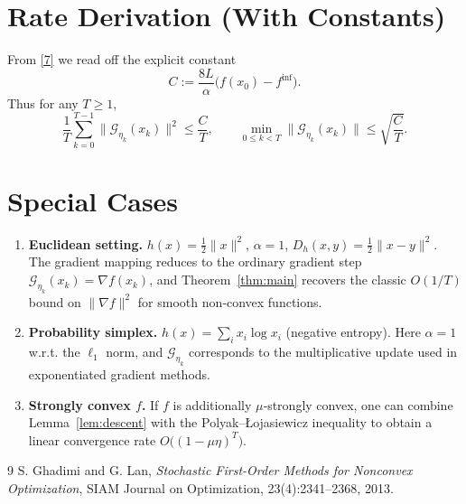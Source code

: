 \documentclass{article}
\newcommand{\Breg}{D_{h}}
\newcommand{\grad}{\nabla}
\begin{document}
\section*{Rate Derivation (With Constants)}
From \eqref{7} we read off the explicit constant
\[
C:=\frac{8L}{\alpha}\bigl(f(x_{0})-f^{\inf}\bigr).
\]
Thus for any $T\ge1$,
\[
\frac{1}{T}\sum_{k=0}^{T-1}\|\mathcal{G}_{\eta_{k}}(x_{k})\|^{2}\le\frac{C}{T},
\qquad
\min_{0\le k<T}\|\mathcal{G}_{\eta_{k}}(x_{k})\|\le\sqrt{\frac{C}{T}}.
\]

\section*{Special Cases}
\begin{enumerate}
\item \textbf{Euclidean setting.} $h(x)=\tfrac12\|x\|^{2}$, $\alpha=1$, $\Breg(x,y)=\tfrac12\|x-y\|^{2}$. The gradient mapping reduces to the ordinary gradient step $\mathcal{G}_{\eta_{k}}(x_{k})=\grad f(x_{k})$, and Theorem~\ref{thm:main} recovers the classic $O(1/T)$ bound on $\|\grad f\|^{2}$ for smooth non‑convex functions.
\item \textbf{Probability simplex.} $h(x)=\sum_{i}x_{i}\log x_{i}$ (negative entropy). Here $\alpha=1$ w.r.t. the $\ell_{1}$ norm, and $\mathcal{G}_{\eta_{k}}$ corresponds to the multiplicative update used in exponentiated gradient methods.
\item \textbf{Strongly convex $f$.} If $f$ is additionally $\mu$‑strongly convex, one can combine Lemma~\ref{lem:descent} with the Polyak–Łojasiewicz inequality to obtain a linear convergence rate $O\big((1-\mu\eta)^{T}\big)$.
\end{enumerate}

\begin{thebibliography}{9}
S. Ghadimi and G. Lan, \emph{Stochastic First-Order Methods for Nonconvex Optimization}, SIAM Journal on Optimization, 23(4):2341–2368, 2013.
\end{thebibliography}
\end{document}
